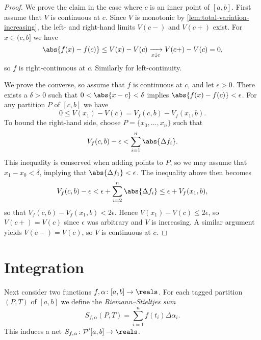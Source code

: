 \documentclass[article, a4paper, 11pt, oneside]{memoir}
\numberwithin{equation}{chapter}
\newcommand{\calP}{\mathcal{P}}
\begin{document}
\begin{proof}
    We prove the claim in the case where $c$ is an inner point of $[a,b]$. First assume that $V$ is continuous at $c$. Since $V$ is monotonic by \cref{lem:total-variation-increasing}, the left- and right-hand limits $V(c-)$ and $V(c+)$ exist. For $x \in (c,b]$ we have
    \begin{equation*}
        \abs{f(x) - f(c)}
            \leq V(x) - V(c)
            \xrightarrow[x \downarrow c]{}
            V(c+) - V(c)
            = 0,
    \end{equation*}
    so $f$ is right-continuous at $c$. Similarly for left-continuity.

    We prove the converse, so assume that $f$ is continuous at $c$, and let $\epsilon > 0$. There exists a $\delta > 0$ such that $0 < \abs{x - c} < \delta$ implies $\abs{f(x) - f(c)} < \epsilon$. For any partition $P$ of $[c,b]$ we have
    \begin{equation*}
        0
            \leq V(x_1) - V(c)
            = V_f(c,b) - V_f(x_1,b).
    \end{equation*}
    To bound the right-hand side, choose $P = \{x_0, \ldots, x_n\}$ such that
    \begin{equation*}
        V_f(c,b) - \epsilon
            < \sum_{i=1}^n \abs{\Delta f_i}.
    \end{equation*}
    This inequality is conserved when adding points to $P$, so we may assume that $x_1 - x_0 < \delta$, implying that $\abs{\Delta f_1} < \epsilon$. The inequality above then becomes
    \begin{equation*}
        V_f(c,b) - \epsilon
            < \epsilon + \sum_{i=2}^n \abs{\Delta f_i}
            \leq \epsilon + V_f(x_1,b),
    \end{equation*}
    so that $V_f(c,b) - V_f(x_1,b) < 2\epsilon$. Hence $V(x_1) - V(c) \leq 2\epsilon$, so $V(c+) = V(c)$ since $\epsilon$ was arbitrary and $V$ is increasing. A similar argument yields $V(c-) = V(c)$, so $V$ is continuous at $c$.
\end{proof}


\section{Integration}

Next consider two functions $f, \alpha \colon [a,b] \to \reals$. For each tagged partition $(P,T)$ of $[a,b]$ we define the \emph{Riemann--Stieltjes sum}
%
\begin{equation*}
    S_{f,\alpha}(P,T)
        = \sum_{i=1}^n f(t_i) \Delta\alpha_i.
\end{equation*}
%
This induces a net $S_{f,\alpha} \colon \calP'[a,b] \to \reals$.
\end{document}
